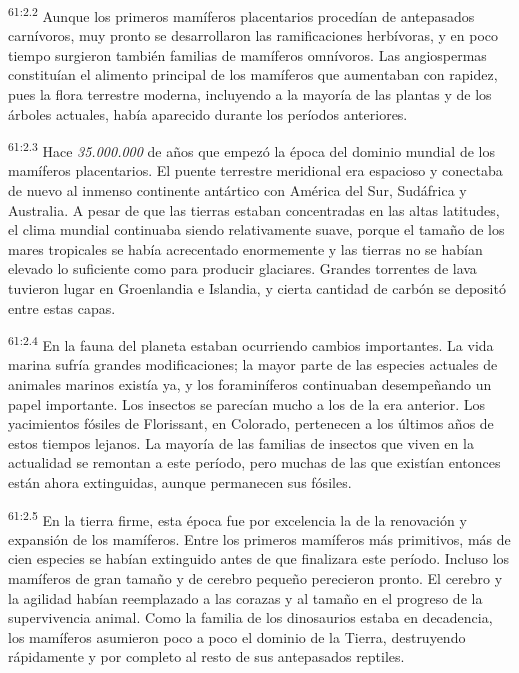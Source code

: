 \par
\textsuperscript{61:2.2} Aunque los primeros mamíferos placentarios procedían de antepasados carnívoros, muy pronto se desarrollaron las ramificaciones herbívoras, y en poco tiempo surgieron también familias de mamíferos omnívoros. Las angiospermas constituían el alimento principal de los mamíferos que aumentaban con rapidez, pues la flora terrestre moderna, incluyendo a la mayoría de las plantas y de los árboles actuales, había aparecido durante los períodos anteriores.

\par
\textsuperscript{61:2.3} Hace \textit{35.000.000} de años que empezó la época del dominio mundial de los mamíferos placentarios. El puente terrestre meridional era espacioso y conectaba de nuevo al inmenso continente antártico con América del Sur, Sudáfrica y Australia. A pesar de que las tierras estaban concentradas en las altas latitudes, el clima mundial continuaba siendo relativamente suave, porque el tamaño de los mares tropicales se había acrecentado enormemente y las tierras no se habían elevado lo suficiente como para producir glaciares. Grandes torrentes de lava tuvieron lugar en Groenlandia e Islandia, y cierta cantidad de carbón se depositó entre estas capas.

\par
\textsuperscript{61:2.4} En la fauna del planeta estaban ocurriendo cambios importantes. La vida marina sufría grandes modificaciones; la mayor parte de las especies actuales de animales marinos existía ya, y los foraminíferos continuaban desempeñando un papel importante. Los insectos se parecían mucho a los de la era anterior. Los yacimientos fósiles de Florissant, en Colorado, pertenecen a los últimos años de estos tiempos lejanos. La mayoría de las familias de insectos que viven en la actualidad se remontan a este período, pero muchas de las que existían entonces están ahora extinguidas, aunque permanecen sus fósiles.

\par
\textsuperscript{61:2.5} En la tierra firme, esta época fue por excelencia la de la renovación y expansión de los mamíferos. Entre los primeros mamíferos más primitivos, más de cien especies se habían extinguido antes de que finalizara este período. Incluso los mamíferos de gran tamaño y de cerebro pequeño perecieron pronto. El cerebro y la agilidad habían reemplazado a las corazas y al tamaño en el progreso de la supervivencia animal. Como la familia de los dinosaurios estaba en decadencia, los mamíferos asumieron poco a poco el dominio de la Tierra, destruyendo rápidamente y por completo al resto de sus antepasados reptiles.

